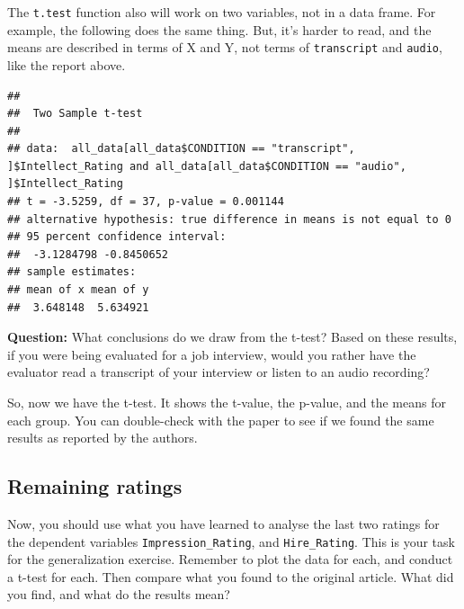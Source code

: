 \documentclass[
]{book}
\newenvironment{Shaded}{\begin{snugshade}}{\end{snugshade}}
\newcommand{\AttributeTok}[1]{\textcolor[rgb]{0.77,0.63,0.00}{#1}}
\newcommand{\FunctionTok}[1]{\textcolor[rgb]{0.00,0.00,0.00}{#1}}
\newcommand{\NormalTok}[1]{#1}
\newcommand{\SpecialCharTok}[1]{\textcolor[rgb]{0.00,0.00,0.00}{#1}}
\newcommand{\StringTok}[1]{\textcolor[rgb]{0.31,0.60,0.02}{#1}}
\begin{document}
The \texttt{t.test} function also will work on two variables, not in a data frame. For example, the following does the same thing. But, it's harder to read, and the means are described in terms of X and Y, not terms of \texttt{transcript} and \texttt{audio}, like the report above.

\begin{Shaded}
\end{Shaded}

\begin{verbatim}
## 
##  Two Sample t-test
## 
## data:  all_data[all_data$CONDITION == "transcript", ]$Intellect_Rating and all_data[all_data$CONDITION == "audio", ]$Intellect_Rating
## t = -3.5259, df = 37, p-value = 0.001144
## alternative hypothesis: true difference in means is not equal to 0
## 95 percent confidence interval:
##  -3.1284798 -0.8450652
## sample estimates:
## mean of x mean of y 
##  3.648148  5.634921
\end{verbatim}

\textbf{Question:} What conclusions do we draw from the t-test? Based on these results, if you were being evaluated for a job interview, would you rather have the evaluator read a transcript of your interview or listen to an audio recording?

So, now we have the t-test. It shows the t-value, the p-value, and the means for each group. You can double-check with the paper to see if we found the same results as reported by the authors.

\hypertarget{remaining-ratings}{%
\subsection{Remaining ratings}\label{remaining-ratings}}

Now, you should use what you have learned to analyse the last two ratings for the dependent variables \texttt{Impression\_Rating}, and \texttt{Hire\_Rating}. This is your task for the generalization exercise. Remember to plot the data for each, and conduct a t-test for each. Then compare what you found to the original article. What did you find, and what do the results mean?
\end{document}
